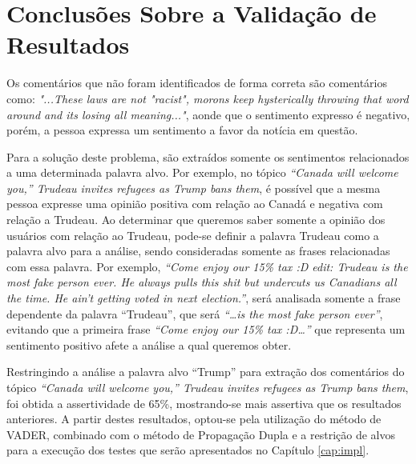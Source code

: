 \section{Conclusões Sobre a Validação de Resultados}

Os comentários que não foram
identificados de forma correta são comentários como: \textit{"...These
laws are not "racist", morons keep hysterically throwing that word around and
its losing all meaning..."}, aonde que o sentimento expresso é negativo, porém,
a pessoa expressa um sentimento a favor da notícia em questão. 

Para a solução deste problema, são extraídos somente os sentimentos relacionados
a uma determinada palavra alvo. Por exemplo, no tópico \textit{``Canada will
welcome you,'' Trudeau invites refugees as Trump bans them}, é possível que a mesma pessoa expresse uma opinião positiva com relação
ao Canadá e negativa com relação a Trudeau. Ao determinar que queremos saber
somente a opinião dos usuários com relação ao Trudeau, pode-se definir a palavra
Trudeau como a palavra alvo para a análise, sendo consideradas somente as
frases relacionadas com essa palavra. Por exemplo, \textit{``Come enjoy our 15\%
tax :D edit: Trudeau is the most fake person ever. He always pulls this shit but
undercuts us Canadians all the time. He ain't getting voted in next
election.''}, será analisada somente a frase dependente da palavra ``Trudeau'',
que será \textit{``\ldots is the most fake person ever''}, evitando que a
primeira frase \textit{``Come enjoy our 15\% tax :D\ldots''} que representa um
sentimento positivo afete a análise a qual queremos obter.

Restringindo a análise a palavra alvo ``Trump'' para extração dos comentários do
tópico \textit{``Canada will welcome you,'' Trudeau invites refugees as Trump
bans them}, foi obtida a assertividade de 65\%, mostrando-se mais assertiva que
os resultados anteriores. A partir destes resultados, optou-se pela utilização
do método de \ac{VADER}, combinado com o método de Propagação Dupla e a
restrição de alvos para a execução dos testes que serão apresentados no Capítulo
\ref{cap:impl}.



